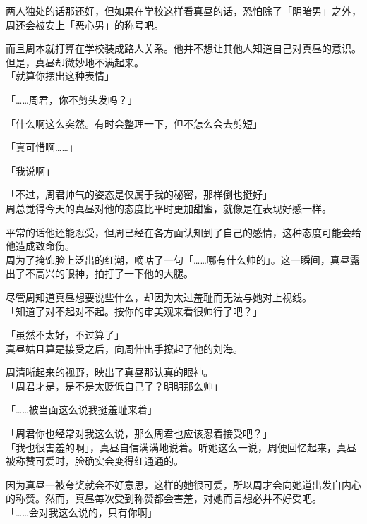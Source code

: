 两人独处的话那还好，但如果在学校这样看真昼的话，恐怕除了「阴暗男」之外，周还会被安上「恶心男」的称号吧。

而且周本就打算在学校装成路人关系。他并不想让其他人知道自己对真昼的意识。\\

但是，真昼却微妙地不满起来。\\

「就算你摆出这种表情」

「……周君，你不剪头发吗？」

「什么啊这么突然。有时会整理一下，但不怎么会去剪短」

「真可惜啊……」

「我说啊」

「不过，周君帅气的姿态是仅属于我的秘密，那样倒也挺好」\\

周总觉得今天的真昼对他的态度比平时更加甜蜜，就像是在表现好感一样。

平常的话他还能忍受，但周已经在各方面认知到了自己的感情，这种态度可能会给他造成致命伤。\\

周为了掩饰脸上泛出的红潮，嘀咕了一句「……哪有什么帅的」。这一瞬间，真昼露出了不高兴的眼神，拍打了一下他的大腿。

尽管周知道真昼想要说些什么，却因为太过羞耻而无法与她对上视线。\\

「知道了对不起对不起。按你的审美观来看很帅行了吧？」

「虽然不太好，不过算了」\\

真昼姑且算是接受之后，向周伸出手撩起了他的刘海。

周清晰起来的视野，映出了真昼那认真的眼神。\\

「周君才是，是不是太贬低自己了？明明那么帅」

「……被当面这么说我挺羞耻来着」

「周君你也经常对我这么说，那么周君也应该忍着接受吧？」\\

「我也很害羞的啊」，真昼自信满满地说着。听她这么一说，周便回忆起来，真昼被称赞可爱时，脸确实会变得红通通的。

因为真昼一被夸奖就会不好意思，这样的她很可爱，所以周才会向她道出发自内心的称赞。然而，真昼每次受到称赞都会害羞，对她而言想必并不好受吧。\\

「……会对我这么说的，只有你啊」

